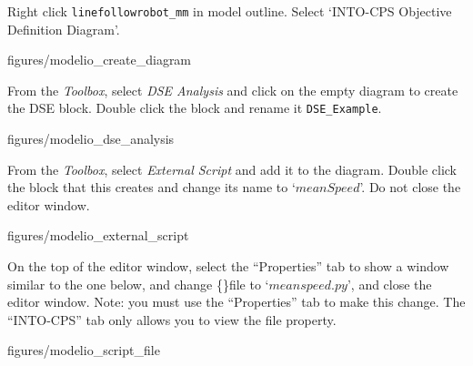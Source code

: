\documentclass[11pt,a4paper]{../tutorial}
\begin{document}
\begin{instructions}
\item Right click \verb=linefollowrobot_mm= in model outline. Select `INTO-CPS \menusep Objective Definition Diagram'.

\begin{center}
\begin{annotation}[width=0.7\linewidth]{figures/modelio_create_diagram}
    \end{annotation}
\end{center}

\newpage

\item From the \emph{Toolbox}, select \emph{DSE Analysis} and click on the empty diagram to create the DSE block.  Double click the block and rename it \verb=DSE_Example=.

\begin{center}
\begin{annotation}[width=0.7\linewidth]{figures/modelio_dse_analysis}
    \end{annotation}
\end{center}

\item \label{start_script_instructions} From the \emph{Toolbox}, select \emph{External Script} and add it to the diagram. Double click the block that this creates and change its name to `$meanSpeed$'. Do not close the editor window.

\begin{center}
\begin{annotation}[width=0.7\linewidth]{figures/modelio_external_script}
    \end{annotation}
\end{center}

\item On the top of the editor window, select the ``Properties'' tab to show a window similar to the one below, and change \{\}file to `$meanspeed.py$', and close the editor window. Note: you must use the ``Properties'' tab to make this change. The ``INTO-CPS'' tab only allows you to view the file property.

\begin{center}
	\begin{annotation}[width=0.7\linewidth]{figures/modelio_script_file}
	\end{annotation}
\end{center}


\end{instructions}
\end{document}

